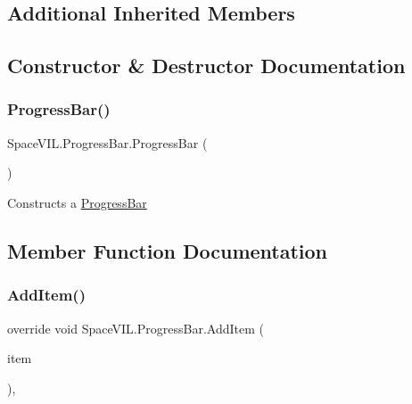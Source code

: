 \subsection*{Additional Inherited Members}


\subsection{Constructor \& Destructor Documentation}
\mbox{\label{class_space_v_i_l_1_1_progress_bar_afaaadcd993c494fd34bff6bd0385faa5}} 
\subsubsection{\texorpdfstring{Progress\+Bar()}{ProgressBar()}}
{\footnotesize\ttfamily Space\+V\+I\+L.\+Progress\+Bar.\+Progress\+Bar (\begin{DoxyParamCaption}{ }\end{DoxyParamCaption})\hspace{0.3cm}{\ttfamily [inline]}}



Constructs a \mbox{\hyperlink{class_space_v_i_l_1_1_progress_bar}{Progress\+Bar}} 



\subsection{Member Function Documentation}
\mbox{\label{class_space_v_i_l_1_1_progress_bar_a5948fb4d1ee63baefb2624c03262a01c}} 
\subsubsection{\texorpdfstring{Add\+Item()}{AddItem()}}
{\footnotesize\ttfamily override void Space\+V\+I\+L.\+Progress\+Bar.\+Add\+Item (\begin{DoxyParamCaption}\item[{\mbox{\hyperlink{interface_space_v_i_l_1_1_core_1_1_i_base_item}{I\+Base\+Item}}}]{item }\end{DoxyParamCaption})\hspace{0.3cm}{\ttfamily [inline]}, {\ttfamily [virtual]}}



